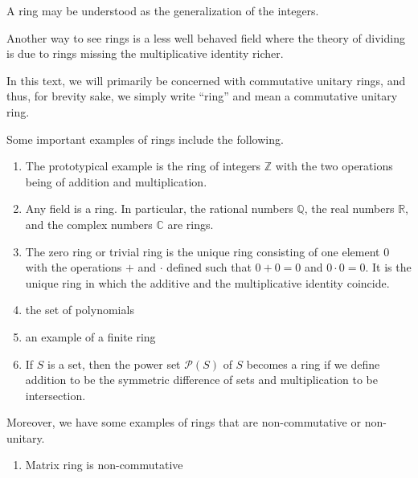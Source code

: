 %
%
%
\begin{intbox}
    \begin{intuition}
        A ring may be understood as the generalization of the integers.

        Another way to see rings is a less well behaved field where the theory of dividing is due to rings missing the multiplicative identity richer.
    \end{intuition}
\end{intbox}
%
%
%
\begin{rembox}
    \begin{remark}
        In this text, we will primarily be concerned with commutative unitary rings, and thus, for brevity sake, we simply write ``ring'' and mean a commutative unitary ring.
    \end{remark}
\end{rembox}
%
%
%
\begin{exmbox}
    \begin{example}
        Some important examples of rings include the following.
        \begin{enumerate}
            \item The prototypical example is the ring of integers \(\mathbb{Z}\) with the two operations being of addition and multiplication.
            \item Any field is a ring. In particular, the rational numbers \(\mathbb{Q}\), the real numbers \(\mathbb{R}\), and the complex numbers \(\mathbb{C}\) are rings.
            \item The zero ring or trivial ring is the unique ring consisting of one element \(0\) with the operations \(+\) and \(\cdot\) defined such that \(0 + 0 = 0\) and \(0 \cdot 0 = 0\). It is the unique ring in which the additive and the multiplicative identity coincide.
            \item the set of polynomials
            \item an example of a finite ring
            \item If \(S\) is a set, then the power set \(\mathcal{P}(S)\) of \(S\) becomes a ring if we define addition to be the symmetric difference of sets and multiplication to be intersection.
        \end{enumerate}
    \end{example}
\end{exmbox}
%
%
%
\begin{example}
    Moreover, we have some examples of rings that are non-commutative or non-unitary.
    \begin{enumerate}
        \item Matrix ring is non-commutative
    \end{enumerate}
\end{example}
